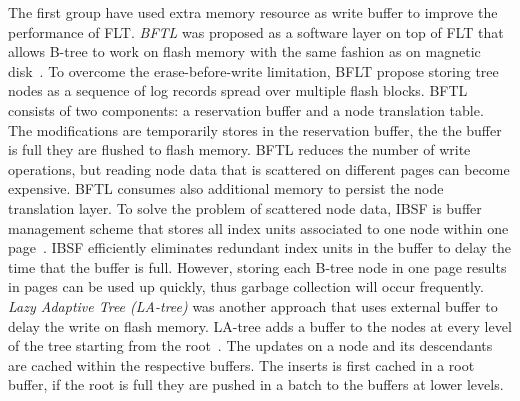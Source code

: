 The first group have used extra memory resource as write buffer to improve the performance of FLT. 
\textit{BFTL} was proposed as a software layer on top of FLT that allows B-tree to work on flash memory with the same fashion as on magnetic disk~\citep{Wu:2007}.
To overcome the erase-before-write limitation, BFLT propose storing tree nodes as a sequence of log records spread over multiple flash blocks.
BFTL consists of two components: a reservation buffer and a node translation table.
The modifications are temporarily stores in the reservation buffer, the the buffer is full they are flushed to flash memory.
BFTL reduces the number of write operations, but reading node data that is scattered on different pages can become expensive.
BFTL consumes also additional memory to persist the node translation layer. 
To solve the problem of scattered node data, IBSF is buffer management scheme that stores all index units associated to one node within one page~\citep{Lee:2010}.
IBSF efficiently eliminates redundant index units in the buffer to delay the time that the buffer is full.
However, storing each B-tree node in one page results in pages can be used up quickly, thus garbage collection will occur frequently.
\textit{Lazy Adaptive Tree (LA-tree)} was another approach that uses external buffer to delay the write on flash memory.
LA-tree adds a buffer to the nodes at every level of the tree starting from the root~\citep{Agrawal:2009}.
The updates on a node and its descendants are cached within the respective buffers. 
The inserts is first cached in a root buffer, if the root is full they are pushed in a batch to the buffers at lower levels.

